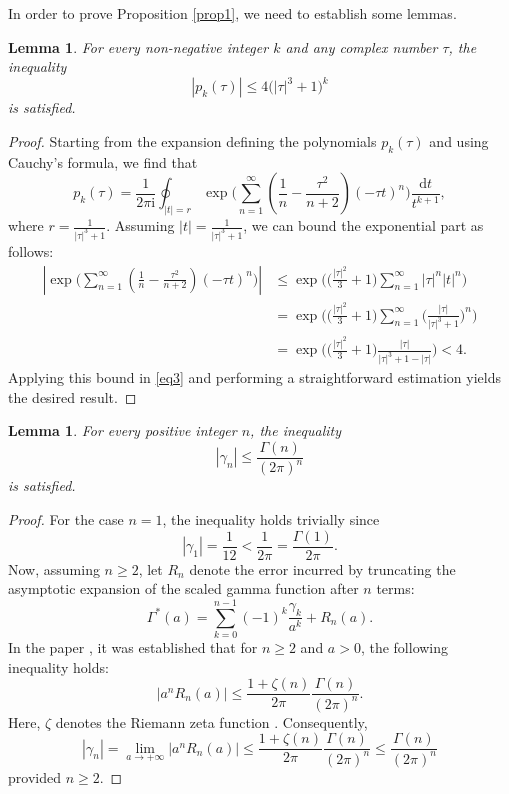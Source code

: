 \documentclass[11pt]{article}
\numberwithin{equation}{section}
\def\im{\mathrm{i}}
\def\d{\mathrm{d}}
\numberwithin{equation}{section}
\newtheorem{Lemma}[Theorem]{Lemma}
\begin{document}
In order to prove Proposition \ref{prop1}, we need to establish some lemmas.

\begin{Lemma}\label{lemma1} For every non-negative integer $k$ and any complex number $\tau$, the inequality
\[
\left| p_k (\tau )\right| \le 4 \bigl(\left| \tau \right|^3 + 1\bigr)^k
\]
is satisfied.
\end{Lemma}

\begin{proof}
Starting from the expansion defining the polynomials $p_k(\tau)$ and using Cauchy's formula, we find that
\begin{equation}\label{eq3}
p_k (\tau ) = \frac{1}{2\pi \im}\oint_{\left| t \right| = r} \exp \bigg( \sum_{n = 1}^\infty \left( \frac{1}{n} - \frac{\tau ^2 }{n + 2} \right)( - \tau t)^n \bigg)\frac{\d t}{t^{k + 1}} ,
\end{equation}
where $r = \frac{1}{\left| \tau \right|^3 + 1}$. Assuming $\left|t\right| = \frac{1}{\left| \tau \right|^3 + 1}$, we can bound the exponential part as follows:
\begin{align*}
\left| \exp \bigg( \sum_{n = 1}^\infty \left( \frac{1}{n} - \frac{\tau ^2}{n + 2} \right)( - \tau t)^n \bigg) \right| & \le \exp \bigg( \bigg( \frac{\left| \tau \right|^2 }{3} + 1 \bigg)\sum_{n = 1}^\infty \left| \tau \right|^n \left| t \right|^n \bigg) \\ & = \exp \bigg( \bigg( \frac{\left| \tau \right|^2 }{3} + 1 \bigg)\sum_{n = 1}^\infty \bigg( \frac{\left| \tau \right|}{\left| \tau \right|^3 + 1} \bigg)^n \bigg) \\ & = \exp \bigg( \bigg( \frac{\left| \tau \right|^2 }{3} + 1 \bigg)\frac{\left| \tau \right|}{\left| \tau \right|^3 + 1 - \left| \tau \right|} \bigg) <4.
\end{align*}
Applying this bound in \eqref{eq3} and performing a straightforward estimation yields the desired result.
\end{proof}

\begin{Lemma}\label{lemma2} For every positive integer $n$, the inequality
\[
\left|\gamma_n\right| \le \frac{\Gamma(n)}{(2\pi)^n}
\]
is satisfied.
\end{Lemma}

\begin{proof} For the case $n=1$, the inequality holds trivially since
\[
\left| \gamma _1 \right| = \frac{1}{12} < \frac{1}{2\pi} = \frac{\Gamma (1)}{2\pi}.
\]
Now, assuming $n\ge 2$, let $R_n$ denote the error incurred by truncating the asymptotic expansion of the scaled gamma function after $n$ terms:
\[
\Gamma^\ast (a)=\sum_{k = 0}^{n - 1} (-1)^k \frac{\gamma _k}{a^k} + R_n (a).
\]
In the paper \cite[equation~(3.11)]{Boyd1994}, it was established that for $n\ge 2$ and $a>0$, the following inequality holds:
\[
\left| a^n R_n (a) \right| \le \frac{1 + \zeta (n)}{2\pi }\frac{\Gamma (n)}{(2\pi )^n}.
\]
Here, $\zeta$ denotes the Riemann zeta function \cite[equation~(25.2.1)]{DLMF}. Consequently,
\[
\left| \gamma_n \right| = \lim_{a \to + \infty } \left| a^n R_n (a) \right| \le \frac{1 + \zeta (n)}{2\pi }\frac{\Gamma (n)}{(2\pi )^n} \le \frac{\Gamma (n)}{(2\pi )^n}
\]
provided $n\ge 2$.
\end{proof}
\end{document}
